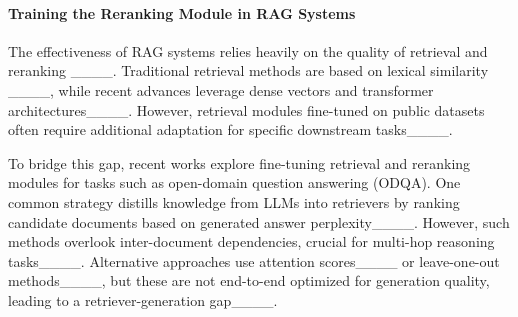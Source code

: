 
\paragraph{Training the Reranking Module in RAG Systems}
The effectiveness of RAG systems relies heavily on the quality of retrieval and reranking ____. Traditional retrieval methods are based on lexical similarity ____, while recent advances leverage dense vectors and transformer architectures____. However, retrieval modules fine-tuned on public datasets often require additional adaptation for specific downstream tasks____.

To bridge this gap, recent works explore fine-tuning retrieval and reranking modules for tasks such as open-domain question answering (ODQA). One common strategy distills knowledge from LLMs into retrievers by ranking candidate documents based on generated answer perplexity____. However, such methods overlook inter-document dependencies, crucial for multi-hop reasoning tasks____. Alternative approaches use attention scores____ or leave-one-out methods____, but these are not end-to-end optimized for generation quality, leading to a retriever-generation gap____.





